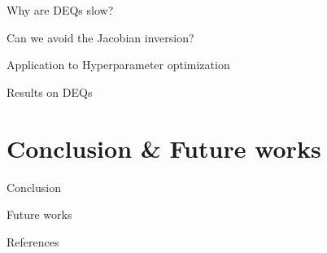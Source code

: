 \documentclass[aspectratio=169,xcolor=dvipsnames]{beamer}
\begin{document}
\begin{frame}{Why are DEQs slow?}
\end{frame}

\begin{frame}{Can we avoid the Jacobian inversion?}
\end{frame}

\begin{frame}{Application to Hyperparameter optimization}
\end{frame}

\begin{frame}{Results on DEQs}

\end{frame}

\section{Conclusion \& Future works}

\begin{frame}{Conclusion}
\end{frame}

\begin{frame}{Future works}
\end{frame}

\begin{frame}[allowframebreaks]{References}
    \printbibliography
\end{frame}
\end{document}
